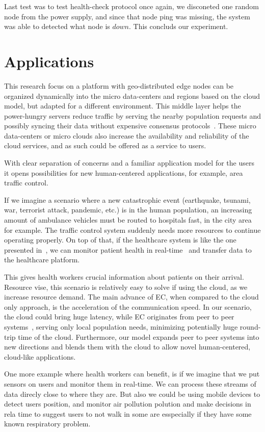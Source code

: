 Last test was to test health-check protocol once again, we disconeted one random node from the power supply, and since that node ping was missing, the system was able to detected what node is $down$. This concluds our experiment.
%
%
\section{Applications}\label{sec:app}
%
This research focus on a platform with geo-distributed edge nodes can be organized dynamically into the micro data-centers and regions based on the cloud model, but adapted for a different environment. This middle layer helps the power-hungry servers reduce traffic by serving the nearby population requests and possibly syncing their data without expensive consensus protocols~\cite{inproceedingsSimic2}. These micro data-centers or micro clouds also increase the availability and reliability of the cloud services, and as such could be offered as a service to users.

With clear separation of concerns and a familiar application model for the users it opens possibilities for new human-centered applications, for example, area traffic control. 

If we imagine a scenario where a new catastrophic event (earthquake, tsunami, war, terrorist attack, pandemic, etc.) is in the human population, an increasing amount of ambulance vehicles must be routed to hospitals fast, in the city area for example. The traffic control system suddenly needs more resources to continue operating properly. On top of that, if the healthcare system is like the one presented in~\cite{OmarBBKR19, inproceedingsSimic5}, we can monitor patient health in real-time~\cite{Al-KhafajiyBCAK19} and transfer data to the healthcare platform. 

This gives health workers crucial information about patients on their arrival. Resource vise, this scenario is relatively easy to solve if using the cloud, as we increase resource demand. The main advance of EC, when compared to the cloud only approach, is the acceleration of the communication speed. In our scenario, the cloud could bring huge latency, while EC originates from peer to peer systems~\cite{LopezMEDHIBFR15}, serving only local population needs, minimizing potentially huge round-trip time of the cloud. Furthermore, our model expands peer to peer systems into new directions and blends them with the cloud to allow novel human-centered, cloud-like applications. 

One more example where health workers can benefit, is if we imagine that we put sensors on users and monitor them in real-time. We can process these streams of data direcly close to where they are. But also we could be using mobile devices to detect users position, and monitor air pollution polution and make decisions in rela time to suggest users to not walk in some are esspecially if they have some known respiratory problem.

